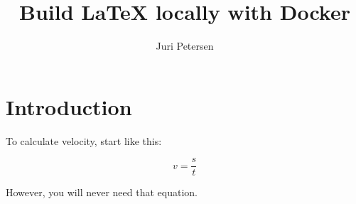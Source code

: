 \documentclass[
	english,
	accentcolor=9c,
	type=intern,
	marginpar=false
	]{article}
\begin{document}
\title{Build LaTeX locally with Docker}
\author{Juri Petersen}

\maketitle

\section{Introduction}

To calculate velocity, start like this:

\begin{equation*}
v = \frac{s}{t}
\end{equation*}

\noindent However, you will never need that equation.
\end{document}
